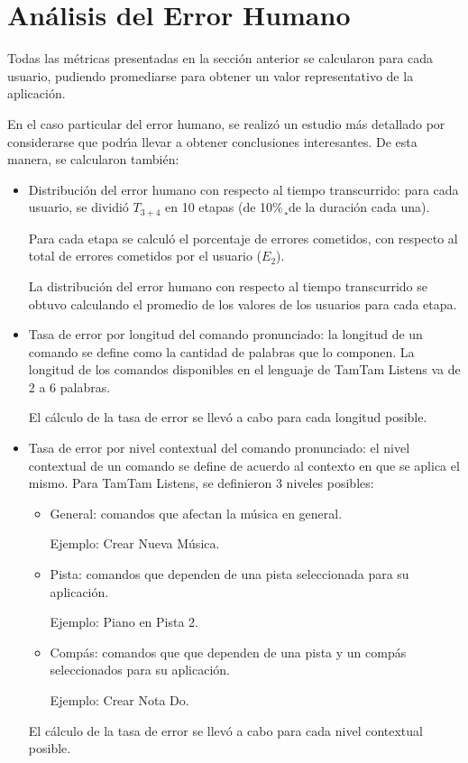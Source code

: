 \section{An\'alisis del Error Humano}
\label{sec:evaluacionError}
Todas las m\'etricas presentadas en la secci\'on anterior se calcularon para cada usuario,
pudiendo promediarse para obtener un valor representativo de la aplicaci\'on.

En el caso particular del error humano, se realiz\'o un estudio m\'as detallado
por considerarse que podr{\'\i}a llevar a obtener conclusiones interesantes. De esta manera,
se calcularon tambi\'en:

\begin{itemize}
	\item Distribuci\'on del error humano con respecto al tiempo transcurrido: para cada usuario, 
	se dividi\'o $T_{3+4}$ en 10 etapas (de 10\%¸de la duraci\'on cada una).

	Para cada etapa se calcul\'o el porcentaje de errores cometidos, con respecto al total de
	errores cometidos por el usuario ($E_2$).

	La distribuci\'on del error humano con respecto al tiempo transcurrido se obtuvo calculando 
	el promedio de los valores de los usuarios para cada etapa.

	\item Tasa de error por longitud del comando pronunciado: la longitud de un comando se define
	como la cantidad de palabras que lo componen. La longitud de los comandos disponibles en el 
	lenguaje de TamTam Listens va de 2 a 6 palabras.

	El c\'alculo de la tasa de error se llev\'o a cabo para cada longitud posible.  


	\item Tasa de error por nivel contextual del comando pronunciado: el nivel contextual de un comando
	se define de acuerdo al contexto en que se aplica el mismo.
	Para TamTam Listens, se definieron 3 niveles posibles:
		\begin{itemize}
			\item General: comandos que afectan la m\'usica en general. 

			Ejemplo: Crear Nueva M\'usica.
			\item Pista: comandos que dependen de una pista seleccionada para su aplicaci\'on. 

			Ejemplo: Piano en Pista 2.
			\item Comp\'as: comandos que que dependen de una pista y un comp\'as seleccionados 
			para su aplicaci\'on. 

			Ejemplo: Crear Nota Do.
		\end{itemize}
		
	El c\'alculo de la tasa de error se llev\'o a cabo para cada nivel contextual posible.  

\end{itemize}